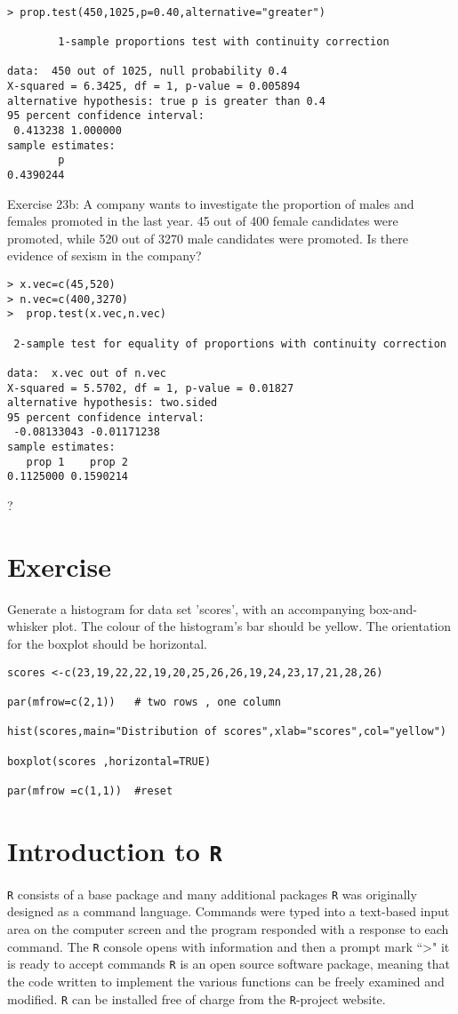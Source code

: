 \documentclass[a4paper,12pt]{article}
\begin{document}
\begin{itemize}
\begin{itemize}
\begin{verbatim}

> prop.test(450,1025,p=0.40,alternative="greater")

        1-sample proportions test with continuity correction

data:  450 out of 1025, null probability 0.4
X-squared = 6.3425, df = 1, p-value = 0.005894
alternative hypothesis: true p is greater than 0.4
95 percent confidence interval:
 0.413238 1.000000
sample estimates:
        p
0.4390244
\end{verbatim}

Exercise 23b:  A company wants to investigate the proportion of males and females promoted in the last year. 45 out of 400 female candidates were promoted, while 520 out of 3270 male candidates were promoted. Is there evidence of sexism in the company?
\begin{verbatim}
> x.vec=c(45,520)
> n.vec=c(400,3270)
>  prop.test(x.vec,n.vec)

 2-sample test for equality of proportions with continuity correction

data:  x.vec out of n.vec
X-squared = 5.5702, df = 1, p-value = 0.01827
alternative hypothesis: two.sided
95 percent confidence interval:
 -0.08133043 -0.01171238
sample estimates:
   prop 1    prop 2
0.1125000 0.1590214
\end{verbatim}

?
\section{Exercise}

Generate a histogram for data set 'scores', with an accompanying box-and-whisker plot.
The colour of the histogram's bar should be yellow. The orientation for the boxplot should be horizontal.

\begin{verbatim}
scores <-c(23,19,22,22,19,20,25,26,26,19,24,23,17,21,28,26)

par(mfrow=c(2,1)) 	# two rows , one column

hist(scores,main="Distribution of scores",xlab="scores",col="yellow")

boxplot(scores ,horizontal=TRUE)

par(mfrow =c(1,1)) 	#reset
\end{verbatim}


\section{Introduction to \texttt{R}}
\texttt{R} consists of a base package and many additional packages
\texttt{R} was originally designed as a command language.  
Commands were typed into a text-based input area on the computer screen and the program responded with a response to each command.
The \texttt{R} console opens with information and then a prompt mark  ``>"  it is ready to accept commands
\texttt{R}  is an open source software package, meaning that the code written to implement the various functions can be freely examined and modified.
\texttt{R} can be installed free of charge from the \texttt{R}-project website.


\end{itemize}
\end{itemize}
\end{document}
